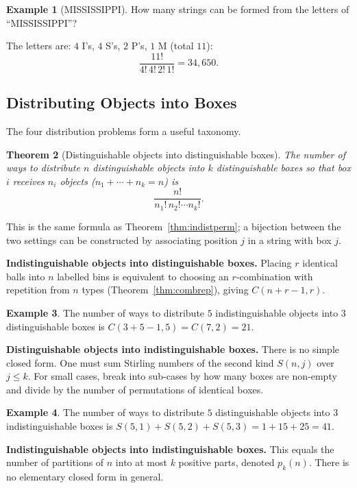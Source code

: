 \documentclass[11pt, a4paper, notitlepage]{report}
\newtheorem{theorem}{Theorem}[section]
\theoremstyle{definition}
\newtheorem{example}[theorem]{Example}
\theoremstyle{remark}
\begin{document}
\begin{example}[MISSISSIPPI]
How many strings can be formed from the letters of ``MISSISSIPPI''?

The letters are: $4$ I's, $4$ S's, $2$ P's, $1$ M (total $11$):
\[
  \frac{11!}{4!\,4!\,2!\,1!} = 34{,}650.
\]
\end{example}

\subsection{Distributing Objects into Boxes}

The four distribution problems form a useful taxonomy.

\begin{theorem}[Distinguishable objects into distinguishable boxes]
\label{thm:distdist}
The number of ways to distribute $n$ distinguishable objects into $k$ distinguishable boxes
so that box $i$ receives $n_i$ objects ($n_1 + \cdots + n_k = n$) is
\[
  \frac{n!}{n_1!\,n_2!\cdots n_k!}.
\]
\end{theorem}

This is the same formula as Theorem~\ref{thm:indistperm}; a bijection between the two settings
can be constructed by associating position $j$ in a string with box $j$.

\medskip\noindent
\textbf{Indistinguishable objects into distinguishable boxes.}
Placing $r$ identical balls into $n$ labelled bins is equivalent to choosing an $r$-combination
with repetition from $n$ types (Theorem~\ref{thm:combrep}), giving $C(n+r-1,r)$.

\begin{example}
The number of ways to distribute $5$ indistinguishable objects into $3$ distinguishable boxes is
$C(3+5-1,5) = C(7,2) = 21$.
\end{example}

\medskip\noindent
\textbf{Distinguishable objects into indistinguishable boxes.}
There is no simple closed form.  One must sum Stirling numbers of the second kind
$S(n,j)$ over $j \leq k$.  For small cases, break into sub-cases by how many boxes are
non-empty and divide by the number of permutations of identical boxes.

\begin{example}
The number of ways to distribute $5$ distinguishable objects into $3$ indistinguishable boxes
is $S(5,1)+S(5,2)+S(5,3) = 1 + 15 + 25 = 41$.
\end{example}

\medskip\noindent
\textbf{Indistinguishable objects into indistinguishable boxes.}
This equals the number of partitions of $n$ into at most $k$ positive parts, denoted $p_k(n)$.
There is no elementary closed form in general.
\end{document}
